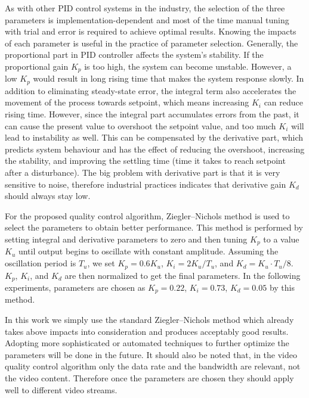 \documentclass[journal]{IEEEtran}
\begin{document}
As with other PID control systems in the industry, the selection of the three parameters is implementation-dependent and most of the time manual tuning with trial and error is required to achieve optimal results. Knowing the impacts of each parameter is useful in the practice of parameter selection. Generally,  the proportional part in PID controller affects the system's stability. If the proportional gain $K_p$ is too high, the system can become unstable. However, a low $K_p$ would result in long rising time that makes the system response slowly. In addition to eliminating steady-state error, the integral term also accelerates the movement of the process towards setpoint, which means increasing $K_i$ can reduce rising time. However, since the integral part accumulates errors from the past, it can cause the present value to overshoot the setpoint value, and too much $K_i$ will lead to instability as well. This can be compensated by the derivative part, which predicts system behaviour and has the effect of reducing the overshoot, increasing the stability, and improving the settling time (time it takes to reach setpoint after a disturbance). The big problem with derivative part is that it is very sensitive to noise, therefore industrial practices indicates that derivative gain $K_d$ should always stay low.

For the proposed quality control algorithm, Ziegler--Nichols method \cite{Ziegler42} is used to select the parameters to obtain better performance. This method is performed by setting integral and derivative parameters to zero and then tuning $K_p$ to a value $K_u$ until output begins to oscillate with constant amplitude. Assuming the oscillation period is $T_u$, we set $K_p = 0.6K_u$, $K_i = 2K_u/T_u$, and $K_d = K_u \cdot T_u/8$. $K_p$, $K_i$, and $K_d$ are then normalized to get the final parameters. In the following experiments, parameters are chosen as $K_p = 0.22$, $K_i = 0.73$, $K_d = 0.05$ by this method.

In this work we simply use the standard Ziegler--Nichols method which already takes above impacts into consideration and produces acceptably good results. Adopting more sophisticated or automated techniques to further optimize the parameters will be done in the future. It should also be noted that, in the video quality control algorithm only the data rate and the bandwidth are relevant, not the video content. Therefore once the parameters are chosen they should apply well to different video streams.


\end{document}
